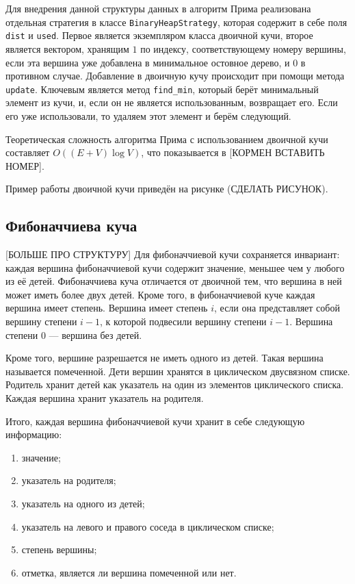 	Для внедрения данной структуры данных в алгоритм Прима реализована отдельная стратегия в классе \texttt{BinaryHeapStrategy}, которая содержит в себе поля \texttt{dist} и \texttt{used}. Первое является экземпляром класса двоичной кучи, второе является вектором, хранящим $1$ по индексу, соответствующему номеру вершины, если эта вершина уже добавлена в минимальное остовное дерево, и $0$ в противном случае. Добавление в двоичную кучу происходит при помощи метода \texttt{update}. Ключевым является метод \texttt{find\_min}, который берёт минимальный элемент из кучи, и, если он не является использованным, возвращает его. Если его уже использовали, то удаляем этот элемент и берём следующий. 
	
	Теоретическая сложность алгоритма Прима с использованием двоичной кучи составляет $O((E + V) \log V)$, что показывается в [КОРМЕН ВСТАВИТЬ НОМЕР]. 
	
	Пример работы двоичной кучи приведён на рисунке (СДЕЛАТЬ РИСУНОК).
	
	\subsection{Фибоначчиева куча}
	
	\hspace{0.5 cm}
	
	[БОЛЬШЕ ПРО СТРУКТУРУ] Для фибоначчиевой кучи сохраняется инвариант: каждая вершина фибоначчиевой кучи содержит значение, меньшее чем у любого из её детей. Фибоначчиева куча отличается от двоичной тем, что вершина в ней может иметь более двух детей. Кроме того, в фибоначчиевой куче каждая вершина имеет степень. Вершина имеет степень $i$, если она представляет собой вершину степени $i-1$, к которой подвесили вершину степени $i-1$. Вершина степени $0$ --- вершина без детей.
	
	Кроме того, вершине разрешается не иметь одного из детей. Такая вершина называется помеченной. Дети вершин хранятся в циклическом двусвязном списке. Родитель хранит детей как указатель на один из элементов циклического списка. Каждая вершина хранит указатель на родителя. 
	
	Итого, каждая вершина фибоначчиевой кучи хранит в себе следующую информацию:
	\begin{enumerate}
		\item значение;
		\item указатель на родителя;
		\item указатель на одного из детей;
		\item указатель на левого и правого соседа в циклическом списке;
		\item степень вершины;
		\item отметка, является ли вершина помеченной или нет.
	\end{enumerate}
	
